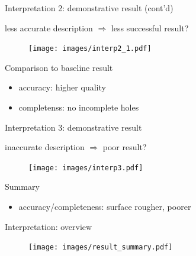 \documentclass[10pt]{beamer}
\begin{document}
\begin{frame}{Interpretation 2: demonstrative result (cont'd)}

less accurate description $\Rightarrow$ less successful result?

\begin{figure}
\centering
\texttt{[image: images/interp2\_1.pdf]}
\end{figure}

\begin{exampleblock}{Comparison to baseline result}
\begin{itemize}
\item accuracy: higher quality
\item completenss: no incomplete holes
\end{itemize}
\end{exampleblock}

\end{frame}

\begin{frame}{Interpretation 3: demonstrative result}

inaccurate description $\Rightarrow$ poor result?

\begin{figure}
\centering
\texttt{[image: images/interp3.pdf]}
\end{figure}

\begin{exampleblock}{Summary}
\begin{itemize}
\item accuracy/completeness: surface rougher, poorer
\end{itemize}
\end{exampleblock}

\end{frame}

\begin{frame}{Interpretation: overview}

\begin{figure}
\centering
\texttt{[image: images/result\_summary.pdf]}
\end{figure}

\end{frame}
\end{document}

